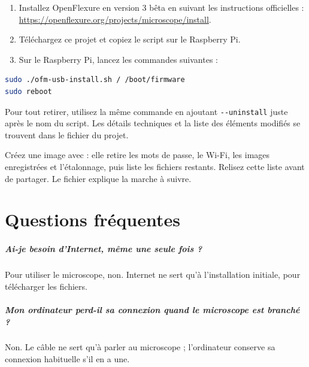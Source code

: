 \documentclass[11pt,a4paper,openany]{report}
\newcommand{\ip}[1]{\texttt{#1}}
\begin{document}
\begin{enumerate}
  \item Installez OpenFlexure en version 3 bêta en suivant les instructions officielles : \url{https://openflexure.org/projects/microscope/install}.
  \item Téléchargez ce projet et copiez le script  sur le Raspberry Pi.
  \item Sur le Raspberry Pi, lancez les commandes suivantes :
\end{enumerate}
\begin{lstlisting}[language=bash,numbers=none]
sudo ./ofm-usb-install.sh / /boot/firmware
sudo reboot
\end{lstlisting}

Pour tout retirer, utilisez la même commande en ajoutant \ip{-{}-uninstall} juste après le nom du script. Les détails techniques et la liste des éléments modifiés se trouvent dans le fichier  du projet.

\begin{attention}
Créez une image avec  : elle retire les mots de passe, le Wi-Fi, les images enregistrées et l'étalonnage, puis liste les fichiers restants. Relisez cette liste avant de partager. Le fichier  explique la marche à suivre.
\end{attention}

\chapter{Questions fréquentes}

\paragraph{Ai-je besoin d'Internet, même une seule fois ?}
Pour utiliser le microscope, non. Internet ne sert qu'à l'installation initiale, pour télécharger les fichiers.

\paragraph{Mon ordinateur perd-il sa connexion quand le microscope est branché ?}
Non. Le câble ne sert qu'à parler au microscope ; l'ordinateur conserve sa connexion habituelle s'il en a une.
\end{document}
